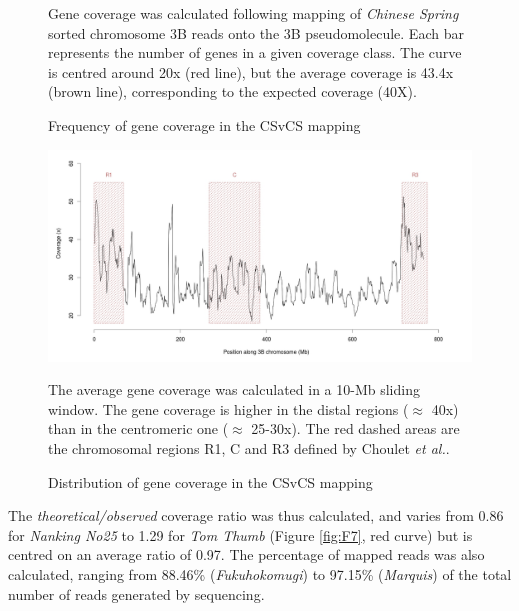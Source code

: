\documentclass[a4paper, 12pt]{article}
\begin{document}
\begin{onehalfspace}
\begin{figure}
          \vspace{0.5cm}
          \caption{Frequency of gene coverage in the CSvCS mapping} 
          \label{fig:F8}
        \footnotesize{Gene coverage was calculated following mapping of \textit{Chinese Spring} sorted chromosome 3B reads onto the 3B pseudomolecule. Each bar represents the number of genes in a given coverage class. The curve is centred around 20x (red line), but the average coverage is 43.4x (brown line), corresponding to the expected coverage (40X).}
        \end{figure}
        \begin{figure}
        \vspace{-0.7cm}
          \centering \includegraphics[scale=0.2]{Figures/Figure_9.jpg}
          \vspace{0.5cm}
          \caption{Distribution of gene coverage in the CSvCS mapping} 
          \label{fig:F9}
        \footnotesize{The average gene coverage was calculated in a 10-Mb sliding window. The gene coverage is higher in the distal regions ($\approx$ 40x) than in the centromeric one ($\approx$ 25-30x). The red dashed areas are the chromosomal regions R1, C and R3 defined by Choulet \textit{et al.}.}
        \end{figure}

\addtocounter{page}{-1}
\newpage
\clearpage 

The \textit{theoretical/observed} coverage ratio was thus calculated, and varies from 0.86 for \textit{Nanking No25} to 1.29 for \textit{Tom Thumb} (Figure \ref{fig:F7}, red curve) but is centred on an average ratio of 0.97. The percentage of mapped reads was also calculated, ranging from 88.46\% (\textit{Fukuhokomugi}) to 97.15\% (\textit{Marquis}) of the total number of reads generated by sequencing.
    

\end{onehalfspace}
\end{document}
